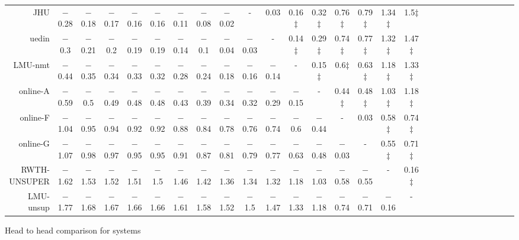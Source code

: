 \begin{tabular}{rccccccccccccccccccccccccccc}
JHU & $-$0.28 & $-$0.18 & $-$0.17 & $-$0.16 & $-$0.16 & $-$0.11 & $-$0.08 & $-$0.02 & - &    0.03 &    0.16$\ddagger$ &    0.32$\ddagger$ &    0.76$\ddagger$ &    0.79$\ddagger$ &    1.34$\ddagger$ &    1.5$\ddagger$ \\ 
uedin & $-$0.3 & $-$0.21 & $-$0.2 & $-$0.19 & $-$0.19 & $-$0.14 & $-$0.1 & $-$0.04 & $-$0.03 & - &    0.14$\ddagger$ &    0.29$\ddagger$ &    0.74$\ddagger$ &    0.77$\ddagger$ &    1.32$\ddagger$ &    1.47$\ddagger$ \\ 
LMU-nmt & $-$0.44 & $-$0.35 & $-$0.34 & $-$0.33 & $-$0.32 & $-$0.28 & $-$0.24 & $-$0.18 & $-$0.16 & $-$0.14 & - &    0.15$\ddagger$ &    0.6$\ddagger$ &    0.63$\ddagger$ &    1.18$\ddagger$ &    1.33$\ddagger$ \\ 
online-A & $-$0.59 & $-$0.5 & $-$0.49 & $-$0.48 & $-$0.48 & $-$0.43 & $-$0.39 & $-$0.34 & $-$0.32 & $-$0.29 & $-$0.15 & - &    0.44$\ddagger$ &    0.48$\ddagger$ &    1.03$\ddagger$ &    1.18$\ddagger$ \\ 
online-F & $-$1.04 & $-$0.95 & $-$0.94 & $-$0.92 & $-$0.92 & $-$0.88 & $-$0.84 & $-$0.78 & $-$0.76 & $-$0.74 & $-$0.6 & $-$0.44 & - &    0.03 &    0.58$\ddagger$ &    0.74$\ddagger$ \\ 
online-G & $-$1.07 & $-$0.98 & $-$0.97 & $-$0.95 & $-$0.95 & $-$0.91 & $-$0.87 & $-$0.81 & $-$0.79 & $-$0.77 & $-$0.63 & $-$0.48 & $-$0.03 & - &    0.55$\ddagger$ &    0.71$\ddagger$ \\ 
RWTH-UNSUPER & $-$1.62 & $-$1.53 & $-$1.52 & $-$1.51 & $-$1.5 & $-$1.46 & $-$1.42 & $-$1.36 & $-$1.34 & $-$1.32 & $-$1.18 & $-$1.03 & $-$0.58 & $-$0.55 & - &    0.16$\ddagger$ \\ 
LMU-unsup & $-$1.77 & $-$1.68 & $-$1.67 & $-$1.66 & $-$1.66 & $-$1.61 & $-$1.58 & $-$1.52 & $-$1.5 & $-$1.47 & $-$1.33 & $-$1.18 & $-$0.74 & $-$0.71 & $-$0.16 & - \\ 


\end{tabular}
\caption{Head to head comparison for \enDE systems}
\label{pairwise-ende}


